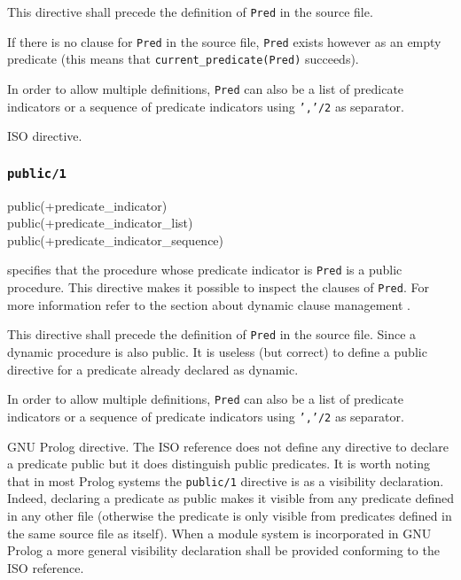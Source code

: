 This directive shall precede the definition of \texttt{Pred} in the source
file.

If there is no clause for \texttt{Pred} in the source file, \texttt{Pred}
exists however as an empty predicate (this means that
\texttt{current\_predicate(Pred)} succeeds). 

In order to allow multiple definitions, \texttt{Pred} can also be a list of
predicate indicators or a sequence of predicate indicators using
\texttt{','/2} as separator.

\Portability

ISO directive.

\subsubsection{\texttt{public/1}}
\label{public/1}

\begin{TemplatesOneCol}
public(+predicate\_indicator)\\
public(+predicate\_indicator\_list)\\
public(+predicate\_indicator\_sequence)

\end{TemplatesOneCol}

\Description

 specifies that the procedure whose predicate indicator
is \texttt{Pred} is a public procedure. This directive makes it possible to
inspect the clauses of \texttt{Pred}. For more information refer to the
section about dynamic clause management .

This directive shall precede the definition of \texttt{Pred} in the source
file. Since a dynamic procedure is also public. It is useless (but correct)
to define a public directive for a predicate already declared as dynamic.

In order to allow multiple definitions, \texttt{Pred} can also be a list of
predicate indicators or a sequence of predicate indicators using
\texttt{','/2} as separator.

\Portability

GNU Prolog directive. The ISO reference does not define any directive to
declare a predicate public but it does distinguish public predicates. It is
worth noting that in most Prolog systems the \texttt{public/1} directive is
as a visibility declaration. Indeed, declaring a predicate as public makes
it visible from any predicate defined in any other file (otherwise the
predicate is only visible from predicates defined in the same source file as
itself). When a module system is incorporated in GNU Prolog a more general
visibility declaration shall be provided conforming to the ISO reference.

